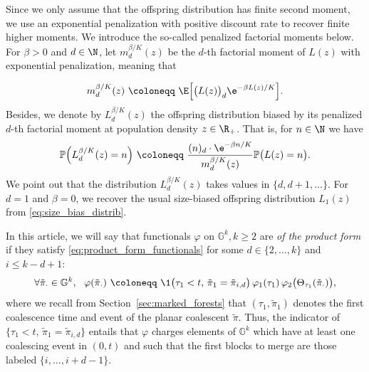 \begin{refsegment}
Since we only assume that the offspring distribution has finite second
moment, we use an exponential penalization with positive discount rate to
recover finite higher moments. We introduce the so-called penalized
factorial moments below. For $\beta>0$ and $d\in \N$, let
$m_{d}^{\beta/K}({z})$ be the $d$-th factorial moment of $L(z)$ with
exponential penalization, meaning that


\begin{equation*}
    m_{d}^{\beta/K}(z)\ \coloneqq\ \E\Big[\big(L(z)\big)_d\e^{-\beta L(z)/K}\Big].
\end{equation*}
Besides, we denote by $L^{\beta/K}_{d}(z)$ the offspring distribution biased by its penalized $d$-th factorial moment at population density $z\in\R_+$. That is, for ${n}\in \N$ we have
\begin{equation}\label{eq:factorial_moments}
 \mathbb{P}\Big(L^{\beta/K}_{d}(z)={n}\Big)\ \coloneqq\ \frac{(n)_d\cdot\e^{-\beta n/K}}{m_{d}^{\beta/K}(z)}\mathbb{P}\big(L(z)=n\big).
\end{equation}
We point out that the distribution $L^{\beta/K}_d(z)$ takes values in $\{d, d+1, \ldots\}$. For $d=1$ and $\beta=0$, we recover the usual size-biased offspring distribution $L_1(z)$ from \eqref{eq:size_bias_distrib}.


 In this article, we will say that functionals $\varphi$ on $\mathbb{G}^k, k\geqslant 2$ are \textit{of the product form} if they satisfy \eqref{eq:product_form_functionals} for some $d\in\{2,\ldots, k\}$ and $i\leqslant k-d+1$:
    \begin{equation}\label{eq:product_form_functionals}
\forall \tilde\pi_\cdot \in\mathbb{G}^{k}, \ \ 
\varphi(\tilde\pi_\cdot)\ \coloneqq\ \1\big( \tau_1<t,\,  \tilde\pi_1=\tilde\pi_{i,d}\big) \, \varphi_1(\tau_1) \, \varphi_2\big(\Theta_{\tau_1}(\tilde\pi_\cdot)\big),
    \end{equation}
where we recall from Section~\ref{sec:marked_forests} that $(\tau_1, \tilde\pi_1)$ denotes the first coalescence time and event of the planar coalescent $\tilde\pi$. Thus, the indicator of $\{\tau_1 < t,\, \tilde\pi_1 = \tilde\pi_{i,d}\}$ entails that $\varphi$ charges elements of $\mathbb{G}^k$ which have at least one coalescing event in $(0,t)$ and such that the first blocks to merge are those labeled $\{i,\ldots , i+d-1\}$.



\end{refsegment}

